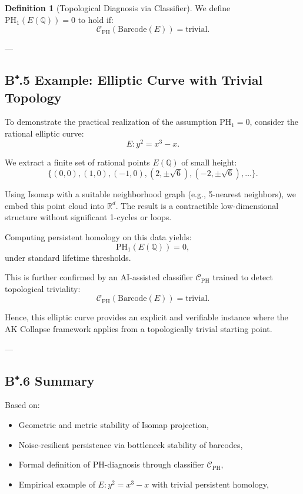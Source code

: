 \documentclass[11pt]{article}
\theoremstyle{definition}
\newtheorem{definition}[theorem]{Definition}
\begin{document}
\begin{definition}[Topological Diagnosis via Classifier]
We define \( \mathrm{PH}_1(E(\mathbb{Q})) = 0 \) to hold if:
\[
\mathcal{C}_{\mathrm{PH}}(\text{Barcode}(E)) = \text{trivial}.
\]
\end{definition}

---

\subsection*{B⁺.5 Example: Elliptic Curve with Trivial Topology}

To demonstrate the practical realization of the assumption \( \mathrm{PH}_1 = 0 \),  
consider the rational elliptic curve:
\[
E: y^2 = x^3 - x.
\]

We extract a finite set of rational points \( E(\mathbb{Q}) \) of small height:
\[
\{(0,0), (1,0), (-1,0), (2, \pm \sqrt{6}), (-2, \pm \sqrt{6}), \dots\}.
\]

Using Isomap with a suitable neighborhood graph (e.g., 5-nearest neighbors), we embed this point cloud into \( \mathbb{R}^d \).  
The result is a contractible low-dimensional structure without significant 1-cycles or loops.

Computing persistent homology on this data yields:
\[
\mathrm{PH}_1(E(\mathbb{Q})) = 0,
\]
under standard lifetime thresholds.  

This is further confirmed by an AI-assisted classifier \( \mathcal{C}_{\mathrm{PH}} \) trained to detect topological triviality:
\[
\mathcal{C}_{\mathrm{PH}}(\text{Barcode}(E)) = \text{trivial}.
\]

Hence, this elliptic curve provides an explicit and verifiable instance  
where the AK Collapse framework applies from a topologically trivial starting point.

---

\subsection*{B⁺.6 Summary}

Based on:
\begin{itemize}
  \item Geometric and metric stability of Isomap projection,
  \item Noise-resilient persistence via bottleneck stability of barcodes,
  \item Formal definition of PH-diagnosis through classifier \( \mathcal{C}_{\mathrm{PH}} \),
  \item Empirical example of \( E: y^2 = x^3 - x \) with trivial persistent homology,
\end{itemize}
\end{document}
